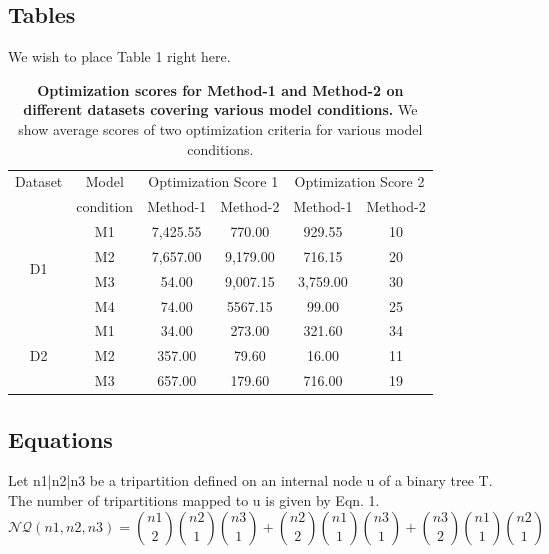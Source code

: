\documentclass[11pt]{article}
\begin{document}
\subsection{Tables}
We wish to place Table 1 right here.
\begin{table}[H]
    \centering
    \caption{ \textbf{Optimization scores for Method-1 and Method-2 on different datasets covering various model conditions.} We show average scores of two optimization criteria for various model conditions.}
    \vspace{1cm}
    \begin{tabular}{|c c|c c|c c|}
       \hline
       Dataset & Model & \multicolumn{2}{|c|}{Optimization Score 1} & \multicolumn{2}{|c|}{Optimization Score 2} \\
      \cline{3-6}
       & condition & Method-1 & Method-2 & Method-1 & Method-2\\
      \hline
     \hline
     \multirow{4}{*}{D1} & M1 & 7,425.55  & 770.00 & 929.55 & 10\\
     & M2 & 7,657.00 & 9,179.00 & 716.15 & 20\\
     & M3 & 54.00 & 9,007.15 & 3,759.00 & 30 \\
     & M4 & 74.00 & 5567.15 & 99.00 & 25 \\
      \hline
     \multirow{3}{*}{D2} & M1 & 34.00 & 273.00 & 321.60 & 34\\
     & M2 & 357.00 & 79.60 & 16.00 & 11\\
     & M3 &  657.00 & 179.60 & 716.00 & 19\\
      \hline
    \end{tabular}
\end{table}
\pagebreak
\subsection{Equations}
Let n1|n2|n3 be a tripartition defined on an internal node u of a binary tree T. The number of tripartitions mapped to u is given by Eqn. 1.
\begin{equation}
   \mathcal{N Q} (n1,n2,n3)= \binom{n1}{2} \binom{n2}{1} \binom{n3}{1} + \binom{n2}{2} \binom{n1}{1} \binom{n3}{1}
   + \binom{n3}{2} \binom{n1}{1} \binom{n2}{1}
   \end{equation}
\end{document}
